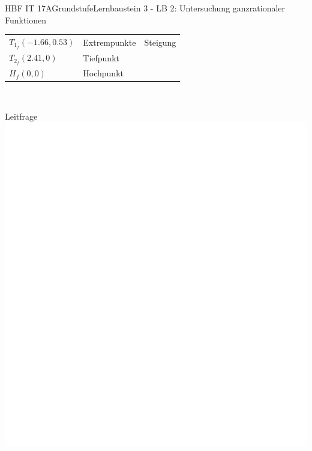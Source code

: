 \documentclass[oneside,openany,headings=optiontotoc,11pt,numbers=noenddot]{scrreprt}
\begin{document}
\begin{worksheet}{HBF IT 17A}{Grundstufe}{Lernbaustein 3 - LB 2: Untersuchung ganzrationaler Funktionen}
		\begin{framed}
			\noindent
			\begin{tabularx}{\textwidth}{XXX}
				\(T_{1_f} (-1.66,0.53)\) & Extrempunkte & Steigung\\
				\(T_{2_f} (2.41,0)\) & Tiefpunkt & \\
				\(H_f (0,0)\) & Hochpunkt\\
				\hline
			\end{tabularx}\\
			\par\noindent
			\tiny{\color{codegray}Leitfrage}\\
			\includegraphics[scale=0.15]{../empty.jpg}
		\end{framed}
		\newpage
		\begin{framed}
			\noindent
			\centering

\end{framed}
\end{worksheet}
\end{document}
